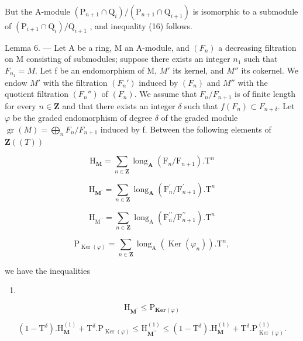 But the A-module \((\mathrm{P}_{n+1} \cap \mathrm{Q}_i)/(\mathrm{P}_{n+1} \cap \mathrm{Q}_{i+1})\) is isomorphic to a submodule of \((\mathrm{P}_{i+1} \cap \mathrm{Q}_i)/\mathrm{Q}_{i+1}\) , and inequality (16) follows.

Lemma 6. --- Let A be a ring, M an A-module, and \((F_{n})\) a decreasing filtration on M consisting of submodules; suppose there exists an integer \(n_{1}\) such that \(F_{n_{1}} = M\). Let f be an endomorphism of M, \(M'\) its kernel, and \(M''\) its cokernel. We endow \(M'\) with the filtration \((F_{n}')\) induced by \((F_{n})\) and \(M''\) with the quotient filtration \((F_{n}'')\) of \((F_{n})\). We assume that \(F_{n}/F_{n+1}\) is of finite length for every \(n \in \mathbf{Z}\) and that there exists an integer \(\delta\) such that \(f(F_{n}) \subset F_{n+\delta}\). Let \(\varphi\) be the graded endomorphism of degree \(\delta\) of the graded module \(\operatorname{gr}(M) = \bigoplus_{n} F_{n}/F_{n+1}\) induced by f. Between the following elements of \(\mathbf{Z}((T))\)

\[
\mathrm{H} _ {\mathbf {M}} = \sum_ {n \in \mathbf {Z}} \operatorname{long} _ {\mathbf {A}} (\mathrm{F} _ {n} / \mathrm{F} _ {n + 1}). \mathrm{T} ^ {n}
\]

\[
\mathrm{H} _ {\mathbf {M} ^ {\prime}} = \sum_ {n \in \mathbf {Z}} \operatorname{long} _ {\mathbf {A}} (\mathrm{F} _ {n} ^ {\prime} / \mathrm{F} _ {n + 1} ^ {\prime}). \mathrm{T} ^ {n}
\]

\[
\mathrm{H} _ {\mathrm{M} ^ {\prime \prime}} = \sum_ {n \in \mathbf {Z}} \operatorname{long} _ {\mathrm{A}} (\mathrm{F} _ {n} ^ {\prime \prime} / \mathrm{F} _ {n + 1} ^ {\prime \prime}). \mathrm{T} ^ {n}
\]

\[
\mathrm{P} _ {\operatorname{Ker} (\varphi)} = \sum_ {n \in \mathbf {Z}} \operatorname{long} _ {\mathrm{A}} (\operatorname{Ker} (\varphi_ {n})). \mathrm{T} ^ {n},
\]

we have the inequalities

\begin{enumerate}
\def\labelenumi{(\arabic{enumi})}
\setcounter{enumi}{16}
\tightlist
\item
\end{enumerate}

\[
\mathrm{H} _ {\mathbf {M} ^ {\prime}} \leqslant \mathrm{P} _ {\mathbf {K e r} (\varphi)}\tag{18}
\]

\[
(1 - \mathrm{T} ^ {\delta}). \mathrm{H} _ {\mathbf {M}} ^ {(1)} + \mathrm{T} ^ {\delta}. \mathrm{P} _ {\operatorname{Ker} (\varphi)} \leqslant \mathrm{H} _ {\mathbf {M} ^ {\prime \prime}} ^ {(1)} \leqslant (1 - \mathrm{T} ^ {\delta}). \mathrm{H} _ {\mathbf {M}} ^ {(1)} + \mathrm{T} ^ {\delta}. \mathrm{P} _ {\operatorname{Ker} (\varphi)} ^ {(1)}.
\]

